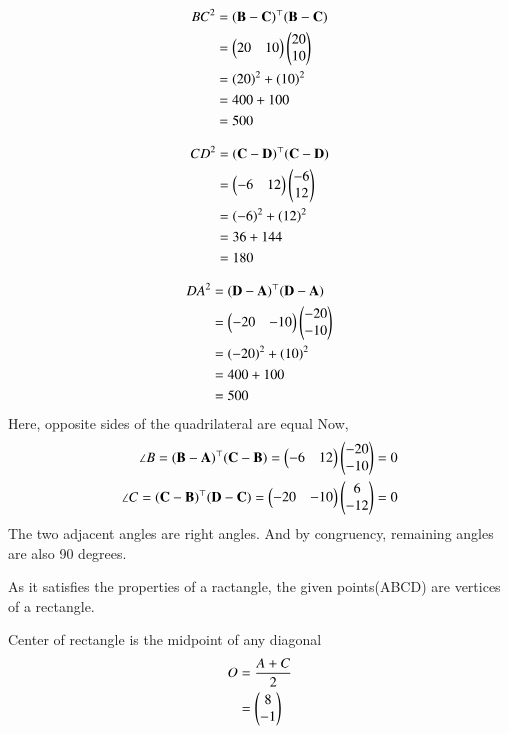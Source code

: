 \documentclass[journal,12pt,twocolumn]{IEEEtran}
\begin{document}
\begin{align}
    BC^2 &= (\mathbf{\mathbf{B} - \mathbf{C}})^\top(\mathbf{\mathbf{B} - \mathbf{C}}) \\
    &=  \begin{pmatrix}20 & 10\end{pmatrix} \begin{pmatrix}20 \\ 10\end{pmatrix}\\
    &= (20)^{2}+ (10)^{2}\\
    &= 400 + 100\\
    &= 500
\end{align}

\begin{align}
    CD^2 &= (\mathbf{\mathbf{C} - \mathbf{D}})^\top(\mathbf{\mathbf{C} - \mathbf{D}}) \\
    &=  \begin{pmatrix}-6 & 12\end{pmatrix} \begin{pmatrix}-6 \\ 12\end{pmatrix}\\
    &= (-6)^{2}+ (12)^{2}\\
    &= 36 + 144\\
    &= 180
\end{align}

\begin{align}
    DA^2 &= (\mathbf{\mathbf{D} - \mathbf{A}})^\top(\mathbf{\mathbf{D} - \mathbf{A}}) \\
    &=  \begin{pmatrix}-20 & -10\end{pmatrix} \begin{pmatrix}-20 \\ -10\end{pmatrix}\\
    &= (-20)^{2}+ (10)^{2}\\
    &= 400 + 100\\
    &= 500
\end{align}
Here, opposite sides of the quadrilateral are equal
Now,
\begin{align}
    \angle B = (\mathbf{\mathbf{B} - \mathbf{A}})^\top(\mathbf{\mathbf{C} - \mathbf{B}}) = \begin{pmatrix}-6 & 12\end{pmatrix} \begin{pmatrix}-20 \\ -10\end{pmatrix}
    &= 0\\
    \angle C = (\mathbf{\mathbf{C} - \mathbf{B}})^\top(\mathbf{\mathbf{D} - \mathbf{C}}) = \begin{pmatrix}-20 & -10\end{pmatrix} \begin{pmatrix}6 \\ -12\end{pmatrix}
    &= 0
\end{align}
The two adjacent angles are right angles. And by congruency, remaining angles are also 90 degrees.

As it satisfies the properties of a ractangle, the given points(ABCD) are vertices of a rectangle.

Center of rectangle is the midpoint of any diagonal
\begin{align}
    O &= \frac{A+C}{2} \\
    &= \begin{pmatrix}8 \\ -1\end{pmatrix}
\end{align}
\end{document}
